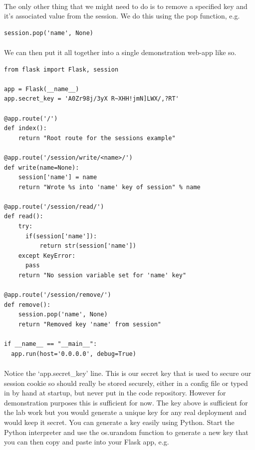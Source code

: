 \documentclass[12pt, a4paper, oneside]{book}
\begin{document}
\paragraph{} The only other thing that we might need to do is to remove a specified key and it's associated value from the session. We do this using the pop function, e.g.
\begin{lstlisting}
session.pop('name', None)
\end{lstlisting}

\paragraph{} We can then put it all together into a single demonstration web-app like so.

\begin{lstlisting}
from flask import Flask, session

app = Flask(__name__)
app.secret_key = 'A0Zr98j/3yX R~XHH!jmN]LWX/,?RT'

@app.route('/')
def index():
    return "Root route for the sessions example"

@app.route('/session/write/<name>/')
def write(name=None):
    session['name'] = name
    return "Wrote %s into 'name' key of session" % name

@app.route('/session/read/')
def read():
    try:
      if(session['name']):
          return str(session['name'])
    except KeyError:
      pass
    return "No session variable set for 'name' key"

@app.route('/session/remove/')
def remove():
    session.pop('name', None)
    return "Removed key 'name' from session"

if __name__ == "__main__":
  app.run(host='0.0.0.0', debug=True)
\end{lstlisting}

\paragraph{} Notice the `app.secret\_key' line. This is our secret key that is used to secure our session cookie so should really be stored securely, either in a config file or typed in by hand at startup, but never put in the code repository. However for demonstration purposes this is sufficient for now. The key above is sufficient for the lab work but you would generate a unique key for any real deployment and would keep it secret. You can generate a key easily using Python. Start the Python interpreter and use the os.urandom function to generate a new key that you can then copy and paste into your Flask app, e.g.
\end{document}
